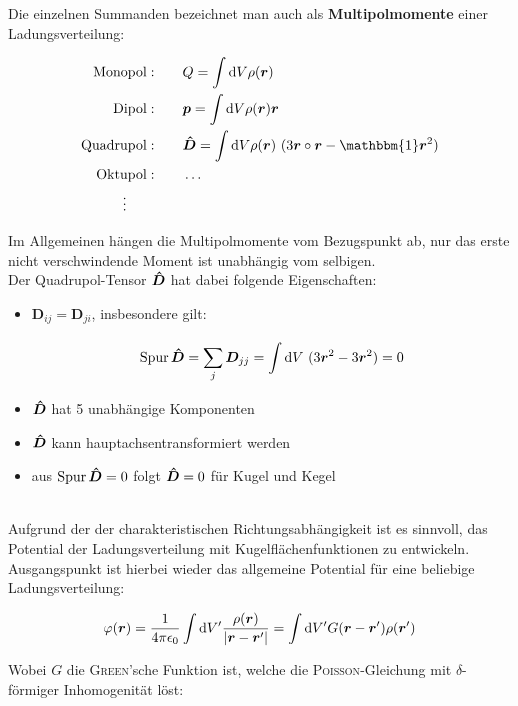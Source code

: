 Die einzelnen Summanden bezeichnet man auch als \textbf{Multipolmomente} einer Ladungsverteilung:

\begin{align*}
\mathrm{Monopol:}& \qquad Q = \int\d V \rho(\vec{r})\\
\mathrm{Dipol:}& \qquad \vec{p} = \int\d V \rho(\vec{r})\vec{r}\\
\mathrm{Quadrupol:}& \qquad \tens{D} = \int\d V \rho(\vec{r}) \ (3\vec{r}\circ\vec{r}-\mathbbm{1}\vec{r}^2)\\
\mathrm{Oktupol:}& \qquad \dotsc\\
\vdots \qquad &
\end{align*}

Im Allgemeinen hängen die Multipolmomente vom Bezugspunkt ab, nur das erste nicht verschwindende Moment ist unabhängig vom selbigen.\\
Der Quadrupol-Tensor $\bm{\hat{D}}$ hat dabei folgende Eigenschaften:\\

\begin{itemize}
\item $\bm{D}_{ij} = \bm{D}_{ji}$, insbesondere gilt:

\begin{equation*}
\operatorname{Spur}\bm{\hat{D}} = \sum_j \bm{D}_{jj} = \int\limits_{{}}^{{}}\mathrm{d}{V}\ (3\bm{r}^2 - 3 \bm{r}^2) =0
\end{equation*}

\item $\bm{\hat{D}}$ hat 5 unabhängige Komponenten
\item $\bm{\hat{D}}$ kann hauptachsentransformiert werden
\item aus $\operatorname{Spur} \bm{\hat{D}}=0$ folgt $\bm{\hat{D}}=0$ für Kugel und Kegel 
\end{itemize}
\ \\

Aufgrund der der charakteristischen Richtungsabhängigkeit ist es sinnvoll, das Potential der Ladungsverteilung mit Kugelflächenfunktionen zu entwickeln. Ausgangspunkt ist hierbei wieder das allgemeine Potential für eine beliebige Ladungsverteilung: 

\begin{equation*}
\varphi(\bm{r}) = \frac{1}{4\pi\epsilon_0}\int\mathrm{d} V' \frac{\rho(\bm{r})}{|\bm{r}-\bm{r}'|} = \int\mathrm{d} V' G(\bm{r}-\bm{r}')\rho(\bm{r}')
\end{equation*}

Wobei $G$ die \textsc{Green}'sche Funktion ist, welche die \textsc{Poisson}-Gleichung mit $\delta$-förmiger Inhomogenität löst:

